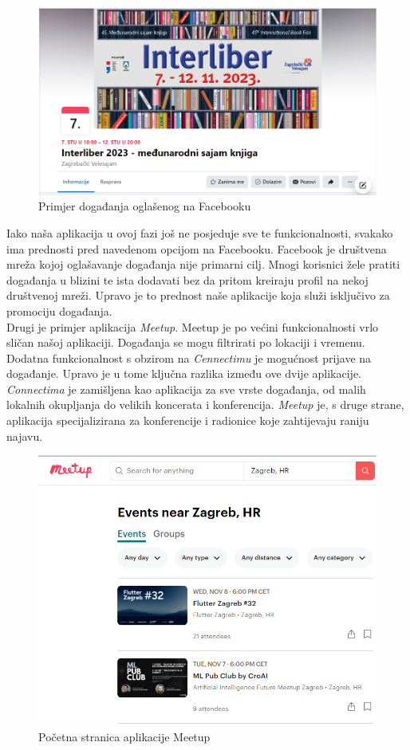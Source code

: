		\begin{figure}[H]
			\includegraphics[scale=0.7]{slike/Facebook_dogadanja.png}
			\centering
			\caption{Primjer događanja oglašenog na Facebooku}
		\end{figure}
		
		Iako naša aplikacija u ovoj fazi još ne posjeduje sve te funkcionalnosti, svakako ima prednosti pred navedenom opcijom na Facebooku. Facebook je društvena mreža kojoj oglašavanje događanja nije primarni cilj. Mnogi korisnici žele pratiti događanja u blizini te ista dodavati bez da pritom kreiraju profil na nekoj društvenoj mreži. Upravo je to prednost naše aplikacije koja služi isključivo za promociju događanja.\\
		
		Drugi je primjer aplikacija \textit{Meetup}. Meetup je po većini funkcionalnosti vrlo sličan našoj aplikaciji. Događanja se mogu filtrirati po lokaciji i vremenu. Dodatna funkcionalnost s obzirom na \textit{Cennectimu} je mogućnost prijave na događanje. Upravo je u tome ključna razlika između ove dvije aplikacije. \textit{Connectima} je zamišljena kao aplikacija za sve vrste događanja, od malih lokalnih okupljanja do velikih koncerata i konferencija. \textit{Meetup} je, s druge strane, aplikacija specijalizirana za konferencije i radionice koje zahtijevaju raniju najavu.
		 
		\begin{figure}[H]
			\includegraphics[scale=0.7]{slike/Meetup.png}
			\centering
			\caption{Početna stranica aplikacije Meetup}
		\end{figure}
		
